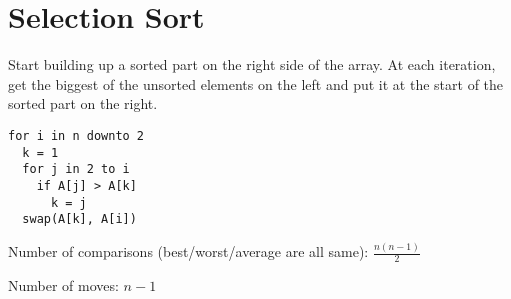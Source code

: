 \section{Selection Sort}

Start building up a sorted part on the right side of the array. At each iteration, get the biggest of the unsorted elements on the left and put it at the start of the sorted part on the right.

\begin{verbatim}
for i in n downto 2
  k = 1
  for j in 2 to i
    if A[j] > A[k]
      k = j
  swap(A[k], A[i])
\end{verbatim}

Number of comparisons (best/worst/average are all same): $\displaystyle \frac{n(n-1)}{2}$

Number of moves: $n - 1$
